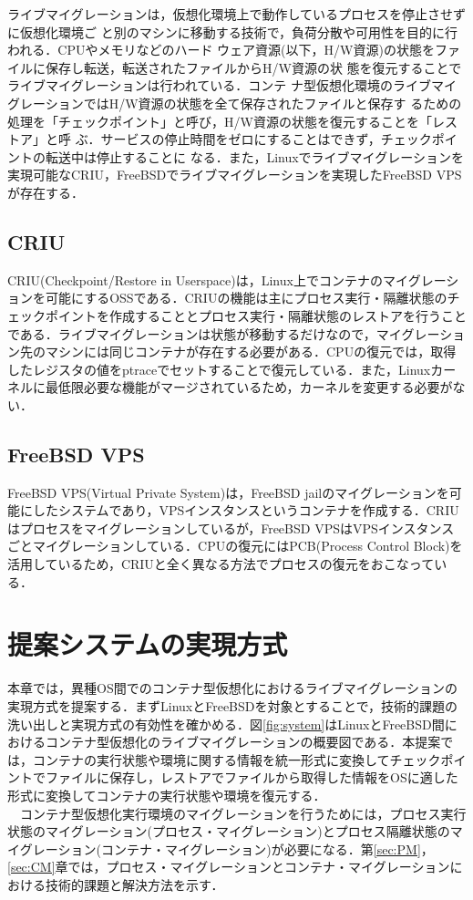 \documentclass[11pt]{jarticle}
\begin{document}
ライブマイグレーションは，仮想化環境上で動作しているプロセスを停止させずに仮想化環境ご
と別のマシンに移動する技術で，負荷分散や可用性を目的に行われる．CPUやメモリなどのハード
ウェア資源(以下，H/W資源)の状態をファイルに保存し転送，転送されたファイルからH/W資源の状
態を復元することでライブマイグレーションは行われている．コンテ
ナ型仮想化環境のライブマイグレーションではH/W資源の状態を全て保存されたファイルと保存す
るための処理を「チェックポイント」と呼び，H/W資源の状態を復元することを「レストア」と呼
ぶ．サービスの停止時間をゼロにすることはできず，チェックポイントの転送中は停止することに
なる．また，Linuxでライブマイグレーションを実現可能なCRIU，FreeBSDでライブマイグレーションを実現したFreeBSD VPSが存在する．

\subsection{CRIU}
\label{sec:CRIU}
CRIU(Checkpoint/Restore in Userspace)は，Linux上でコンテナのマイグレーションを可能にするOSSである．CRIUの機能は主にプロセス実行・隔離状態のチェックポイントを作成することとプロセス実行・隔離状態のレストアを行うことである．ライブマイグレーションは状態が移動するだけなので，マイグレーション先のマシンには同じコンテナが存在する必要がある．CPUの復元では，取得したレジスタの値をptraceでセットすることで復元している．また，Linuxカーネルに最低限必要な機能がマージされているため，カーネルを変更する必要がない．

\subsection{FreeBSD VPS}
\label{sec:FreeBSD VPS}
FreeBSD VPS(Virtual Private System)は，FreeBSD jailのマイグレーションを可能にしたシステムであり，VPSインスタンスというコンテナを作成する．CRIUはプロセスをマイグレーションしているが，FreeBSD VPSはVPSインスタンスごとマイグレーションしている．CPUの復元にはPCB(Process Control Block)を活用しているため，CRIUと全く異なる方法でプロセスの復元をおこなっている．

\section{提案システムの実現方式}
\label{sec:suggest}
本章では，異種OS間でのコンテナ型仮想化におけるライブマイグレーションの実現方式を提案する．まずLinuxとFreeBSDを対象とすることで，技術的課題の洗い出しと実現方式の有効性を確かめる．図\ref{fig:system}はLinuxとFreeBSD間におけるコンテナ型仮想化のライブマイグレーションの概要図である．本提案では，コンテナの実行状態や環境に関する情報を統一形式に変換してチェックポイントでファイルに保存し，レストアでファイルから取得した情報をOSに適した形式に変換してコンテナの実行状態や環境を復元する．\\
　コンテナ型仮想化実行環境のマイグレーションを行うためには，プロセス実行状態のマイグレーション(プロセス・マイグレーション)とプロセス隔離状態のマイグレーション(コンテナ・マイグレーション)が必要になる．第\ref{sec:PM}，\ref{sec:CM}章では，プロセス・マイグレーションとコンテナ・マイグレーションにおける技術的課題と解決方法を示す．
\end{document}
